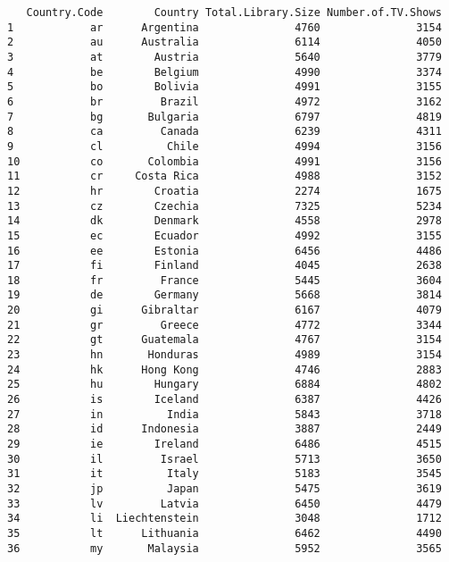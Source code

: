 \documentclass[
]{article}
\begin{document}
\begin{verbatim}
   Country.Code        Country Total.Library.Size Number.of.TV.Shows
1            ar      Argentina               4760               3154
2            au      Australia               6114               4050
3            at        Austria               5640               3779
4            be        Belgium               4990               3374
5            bo        Bolivia               4991               3155
6            br         Brazil               4972               3162
7            bg       Bulgaria               6797               4819
8            ca         Canada               6239               4311
9            cl          Chile               4994               3156
10           co       Colombia               4991               3156
11           cr     Costa Rica               4988               3152
12           hr        Croatia               2274               1675
13           cz        Czechia               7325               5234
14           dk        Denmark               4558               2978
15           ec        Ecuador               4992               3155
16           ee        Estonia               6456               4486
17           fi        Finland               4045               2638
18           fr         France               5445               3604
19           de        Germany               5668               3814
20           gi      Gibraltar               6167               4079
21           gr         Greece               4772               3344
22           gt      Guatemala               4767               3154
23           hn       Honduras               4989               3154
24           hk      Hong Kong               4746               2883
25           hu        Hungary               6884               4802
26           is        Iceland               6387               4426
27           in          India               5843               3718
28           id      Indonesia               3887               2449
29           ie        Ireland               6486               4515
30           il         Israel               5713               3650
31           it          Italy               5183               3545
32           jp          Japan               5475               3619
33           lv         Latvia               6450               4479
34           li  Liechtenstein               3048               1712
35           lt      Lithuania               6462               4490
36           my       Malaysia               5952               3565

\end{verbatim}
\end{document}
